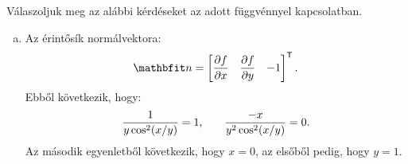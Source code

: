 \begin{exercise}{Válaszoljuk meg az alábbi kérdéseket az adott függvénnyel kapcsolatban.}
{\begin{enumerate}[a)]
\[\begin{bmatrix}
            \end{bmatrix}^{\mathsf T}
            \begin{bmatrix}
              3/5 \\ -4/5
            \end{bmatrix}
            = \frac{3 + 4\pi}{5}
            \text.
          \]
          Az érintő egyenlete ezek alapján:
          \[
            \frac{x - \pi}{3/5} = \frac{y - 1}{-4/5} = \frac{z - 0}{(3 + 4\pi)/5}
            \text.
          \]
    \item Az érintősík normálvektora:
          \[
            \rvec n = \begin{bmatrix}
              \displaystyle\pdv{f}{x} & \displaystyle\pdv{f}{y} & -1
            \end{bmatrix}^{\mathsf T}
            \text.
          \]
          Ebből következik, hogy:
          \[
            \dfrac{1}{y \cos^2(x / y)} = 1
            \text,\qquad
            \dfrac{-x}{y^2 \cos^2(x / y)} = 0
            \text.
          \]
          Az második egyenletből következik, hogy $x = 0$, az elsőből pedig,
          hogy $y = 1$.
  \end{enumerate}
  }
\end{exercise}
